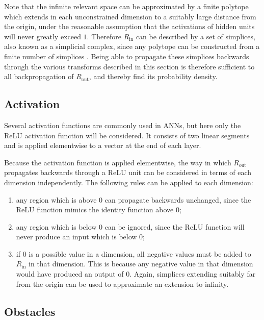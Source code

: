 \documentclass[../../main.tex]{subfiles}
\begin{document}
Note that the infinite relevant space can be approximated by a finite polytope which extends in each unconstrained dimension to a suitably large distance from the origin, under the reasonable assumption that the activations of hidden units will never greatly exceed $1$.
Therefore $R_\text{in}$ can be described by a set of simplices, also known as a simplicial complex, since any polytope can be constructed from a finite number of simplices \cite{wildberger12}.
Being able to propagate these simplices backwards through the various transforms described in this section is therefore sufficient to all backpropagation of $R_\text{out}$, and thereby find its probability density.

\subsection{Activation} \label{subsection:activation}

Several activation functions are commonly used in ANNs, but here only the ReLU activation function \cite{agarap19} will be considered.
It consists of two linear segments and is applied elementwise to a vector at the end of each layer.

Because the activation function is applied elementwise, the way in which $R_\text{out}$ propagates backwards through a ReLU unit can be considered in terms of each dimension independently.
The following rules can be applied to each dimension:
\begin{enumerate}
    \item any region which is above $0$ can propagate backwards unchanged, since the ReLU function mimics the identity function above $0$;
    \item any region which is below $0$ can be ignored, since the ReLU function will never produce an input which is below $0$;
    \item if $0$ is a possible value in a dimension, all negative values must be added to $R_\text{in}$ in that dimension.
    This is because any negative value in that dimension would have produced an output of $0$.
    Again, simplices extending suitably far from the origin can be used to approximate an extension to infinity.
\end{enumerate}

\subsection{Obstacles} \label{subsection:obstacles}
\end{document}
